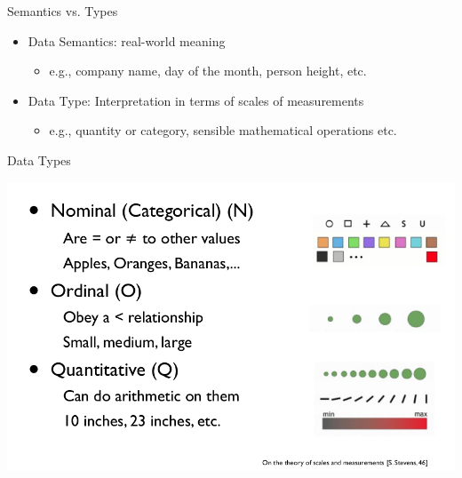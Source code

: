 \documentclass{beamer}
\begin{document}
\begin{frame}{Semantics vs. Types} 
    \begin{itemize}
        \item Data Semantics: real-world meaning 
        \begin{itemize}
            \item e.g., company name, day of the month, person height, etc.
        \end{itemize}
        \item Data Type: Interpretation in terms of scales of measurements
        \begin{itemize}
            \item e.g., quantity or category, sensible mathematical operations etc.
        \end{itemize}
    \end{itemize}
\end{frame}  

\begin{frame}{Data Types}
    \begin{center}                                                                                                           
        \includegraphics[scale=0.35]{dataTypes1.png}                                                                    
    \end{center}                                                                                                             
\end{frame}   
\end{document}
